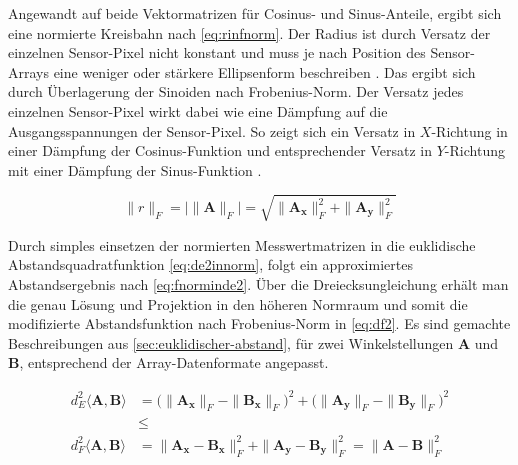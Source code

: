 \clearpage


Angewandt auf beide Vektormatrizen für Cosinus- und Sinus-Anteile, ergibt sich eine normierte Kreisbahn nach \autoref{eq:rinfnorm}. Der Radius ist durch Versatz der einzelnen Sensor-Pixel nicht konstant und muss je nach Position des Sensor-Arrays eine weniger oder stärkere Ellipsenform beschreiben \cite{Schuethe2019}. Das ergibt sich durch Überlagerung der Sinoiden nach Frobenius-Norm. Der Versatz jedes einzelnen Sensor-Pixel wirkt dabei wie eine Dämpfung auf die Ausgangsspannungen der Sensor-Pixel. So zeigt sich ein Versatz in $X$-Richtung in einer Dämpfung der Cosinus-Funktion und entsprechender Versatz in $Y$-Richtung mit einer Dämpfung der Sinus-Funktion \cite{Schuethe2019}.


\begin{equation}\label{eq:rinfnorm}
	\|r\|_F = \big|\|\mathbf{A}\|_F\big| = \sqrt{\|\mathbf{A_x}\|_F^2 + \|\mathbf{A_y}\|_F^2}
\end{equation}


Durch simples einsetzen der normierten Messwertmatrizen in die euklidische Abstandsquadratfunktion \autoref{eq:de2innorm}, folgt ein approximiertes Abstandsergebnis nach \autoref{eq:fnorminde2}. Über die Dreiecksungleichung erhält man die genau Lösung und Projektion in den höheren Normraum \cite{Plum2012}\cite{vandeGeijn2014} und somit die modifizierte Abstandsfunktion nach Frobenius-Norm \cite{Schuethe2020}\cite{Schuethe2020b} in \autoref{eq:df2}. Es sind gemachte Beschreibungen aus \autoref{sec:euklidischer-abstand}, für zwei Winkelstellungen $\mathbf{A}$ und $\mathbf{B}$, entsprechend der Array-Datenformate angepasst.


\begin{align}
\label{eq:fnorminde2}
d_E^2\langle\mathbf{A},\mathbf{B}\rangle &= \big(\|\mathbf{A_x}\|_F - \|\mathbf{B_x}\|_F\big)^2 + \big(\|\mathbf{A_y}\|_F - \|\mathbf{B_y}\|_F\big)^2 \\
&\le \nonumber \\
\label{eq:df2}
d_F^2\langle\mathbf{A},\mathbf{B}\rangle &= \|\mathbf{A_x} - \mathbf{B_x}\|_F^2 + \|\mathbf{A_y} - \mathbf{B_y}\|_F^2 = \|\mathbf{A} - \mathbf{B}\|_F^2
\end{align}


